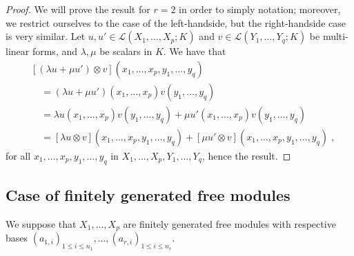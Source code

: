 \documentclass{report}
\theoremstyle{definition}
\theoremstyle{remark}
\begin{document}
\begin{proof}
        We will prove the result for $r= 2$ in order to simply notation; moreover, we restrict ourselves to the case of the left-handside, but the right-handside case is very similar.
        Let $u,u' \in \mathcal{L}(X_1,\dots,X_p;K)$ and $v \in \mathcal{L}(Y_1,\dots,Y_q;K)$ be multi-linear forms, and $\lambda,\mu$ be scalars in $K$. We have that
        \begin{equation*}
                \begin{split}
                        & [(\lambda u +\mu u')\otimes v] (x_1,\dots,x_p,y_1,\dots,y_q)  \\
                        &\quad = (\lambda u + \mu u')(x_1,\dots,x_p)v(y_1,\dots,y_q) \\
                        &\quad = \lambda u(x_1,\dots,x_p)v(y_1,\dots,y_q) + \mu u'(x_1,\dots,x_p)v(y_1,\dots,y_q)\\
                        &\quad = [\lambda u\otimes v] (x_1,\dots,x_p,y_1,\dots,y_q) + [\mu u' \otimes v](x_1,\dots,x_p,y_1,\dots,y_q)\;,
                \end{split}
        \end{equation*}
for all $x_1,\dots,x_p,y_1,\dots,y_q$ in $X_1,\dots,X_p,Y_1,\dots,Y_q$, hence the result.
\end{proof}


\bigskip

\subsection{Case of finitely generated free modules }


We suppose that $X_1,\dots, X_p$ are finitely generated free modules with respective bases $(a_{1,i})_{1\leq i \leq n_1},\dots,(a_{r,i})_{1 \leq i \leq n_r}$.
\end{document}
